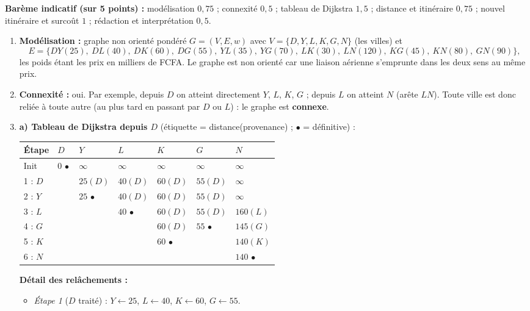 \documentclass[11pt]{article}
\begin{document}
\begin{corrige}
\textbf{Barème indicatif (sur 5 points) :} modélisation $0,75$ ; connexité $0,5$ ; tableau de Dijkstra $1,5$ ; distance et itinéraire $0,75$ ; nouvel itinéraire et surcoût $1$ ; rédaction et interprétation $0,5$.
\begin{enumerate}
\item \textbf{Modélisation :} graphe non orienté pondéré $G = (V, E, w)$ avec $V = \{D, Y, L, K, G, N\}$ (les villes) et
\[ E = \{DY(25),\ DL(40),\ DK(60),\ DG(55),\ YL(35),\ YG(70),\ LK(30),\ LN(120),\ KG(45),\ KN(80),\ GN(90)\}, \]
les poids étant les prix en milliers de FCFA. Le graphe est non orienté car une liaison aérienne s'emprunte dans les deux sens au même prix.
\item \textbf{Connexité :} oui. Par exemple, depuis $D$ on atteint directement $Y$, $L$, $K$, $G$ ; depuis $L$ on atteint $N$ (arête $LN$). Toute ville est donc reliée à toute autre (au plus tard en passant par $D$ ou $L$) : le graphe est \textbf{connexe}.
\item \textbf{a) Tableau de Dijkstra depuis $D$} (étiquette = distance(provenance) ; $\bullet$ = définitive) :
\begin{center}
\begin{tabularx}{\linewidth}{|l|X|X|X|X|X|X|}
\hline
\rowcolor{popblueL} Étape & $D$ & $Y$ & $L$ & $K$ & $G$ & $N$ \\
\hline
Init & $0\,\bullet$ & $\infty$ & $\infty$ & $\infty$ & $\infty$ & $\infty$ \\
\hline
1 : $D$ & & $25(D)$ & $40(D)$ & $60(D)$ & $55(D)$ & $\infty$ \\
\hline
2 : $Y$ & & $25\,\bullet$ & $40(D)$ & $60(D)$ & $55(D)$ & $\infty$ \\
\hline
3 : $L$ & & & $40\,\bullet$ & $60(D)$ & $55(D)$ & $160(L)$ \\
\hline
4 : $G$ & & & & $60(D)$ & $55\,\bullet$ & $145(G)$ \\
\hline
5 : $K$ & & & & $60\,\bullet$ & & $140(K)$ \\
\hline
6 : $N$ & & & & & & $140\,\bullet$ \\
\hline
\end{tabularx}
\end{center}
\textbf{Détail des relâchements :}
\begin{itemize}
    \item \emph{Étape 1} ($D$ traité) : $Y \leftarrow 25$, $L \leftarrow 40$, $K \leftarrow 60$, $G \leftarrow 55$.

\end{itemize}
\end{enumerate}
\end{corrige}
\end{document}
